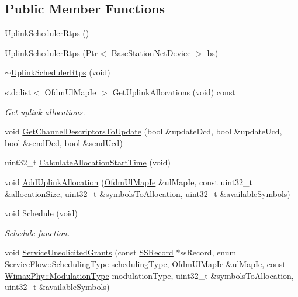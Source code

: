 \subsection*{Public Member Functions}
\begin{DoxyCompactItemize}
\item 
\hyperlink{classns3_1_1UplinkSchedulerRtps_abb7bd631422652d8bbf06dc3b5b74f72}{Uplink\+Scheduler\+Rtps} ()
\item 
\hyperlink{classns3_1_1UplinkSchedulerRtps_a96163ef1bec8e9cfaa7e467d71758e36}{Uplink\+Scheduler\+Rtps} (\hyperlink{classns3_1_1Ptr}{Ptr}$<$ \hyperlink{classns3_1_1BaseStationNetDevice}{Base\+Station\+Net\+Device} $>$ bs)
\item 
\hyperlink{classns3_1_1UplinkSchedulerRtps_a8cebc01f81be845cf278948ea4e070a8}{$\sim$\+Uplink\+Scheduler\+Rtps} (void)
\item 
\hyperlink{openflow-interface_8h_afd9bcfa176617760671b67580f536fa7}{std\+::list}$<$ \hyperlink{classns3_1_1OfdmUlMapIe}{Ofdm\+Ul\+Map\+Ie} $>$ \hyperlink{classns3_1_1UplinkSchedulerRtps_af57c0819227d4d0690036b76c9f4c79c}{Get\+Uplink\+Allocations} (void) const 
\begin{DoxyCompactList}\small\item\em Get uplink allocations. \end{DoxyCompactList}\item 
void \hyperlink{classns3_1_1UplinkSchedulerRtps_a81d2d944421fd34d2b260f406b7a0649}{Get\+Channel\+Descriptors\+To\+Update} (bool \&update\+Dcd, bool \&update\+Ucd, bool \&send\+Dcd, bool \&send\+Ucd)
\item 
uint32\+\_\+t \hyperlink{classns3_1_1UplinkSchedulerRtps_ac5ae2f7c51fd1aa551813d0b12dc8013}{Calculate\+Allocation\+Start\+Time} (void)
\item 
void \hyperlink{classns3_1_1UplinkSchedulerRtps_aea8d8f5701bf3b5f992d1b43471340d2}{Add\+Uplink\+Allocation} (\hyperlink{classns3_1_1OfdmUlMapIe}{Ofdm\+Ul\+Map\+Ie} \&ul\+Map\+Ie, const uint32\+\_\+t \&allocation\+Size, uint32\+\_\+t \&symbols\+To\+Allocation, uint32\+\_\+t \&available\+Symbols)
\item 
void \hyperlink{classns3_1_1UplinkSchedulerRtps_a3863d85ca853d4b8b1033a38d0ff9dcd}{Schedule} (void)
\begin{DoxyCompactList}\small\item\em Schedule function. \end{DoxyCompactList}\item 
void \hyperlink{classns3_1_1UplinkSchedulerRtps_ab101ce69266831aad941b4c553d82026}{Service\+Unsolicited\+Grants} (const \hyperlink{classns3_1_1SSRecord}{S\+S\+Record} $\ast$ss\+Record, enum \hyperlink{classns3_1_1ServiceFlow_a7990ba10be1e098328fd1e6382a26235}{Service\+Flow\+::\+Scheduling\+Type} scheduling\+Type, \hyperlink{classns3_1_1OfdmUlMapIe}{Ofdm\+Ul\+Map\+Ie} \&ul\+Map\+Ie, const \hyperlink{classns3_1_1WimaxPhy_a044c5d8a48ca992c39c2a946f6e755fa}{Wimax\+Phy\+::\+Modulation\+Type} modulation\+Type, uint32\+\_\+t \&symbols\+To\+Allocation, uint32\+\_\+t \&available\+Symbols)

\end{DoxyCompactItemize}

